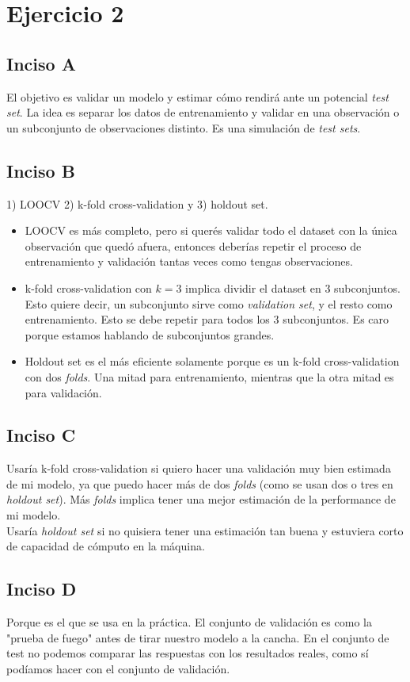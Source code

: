 \documentclass{article}
\begin{document}
    \section*{Ejercicio 2}
        \subsection*{Inciso A}
            El objetivo es validar un modelo y estimar cómo rendirá ante un potencial \textit{test set}. La idea es separar los datos de entrenamiento y validar en una observación o un subconjunto de observaciones distinto. Es una simulación de \textit{test sets}.
        \subsection*{Inciso B}
            1) LOOCV 2) k-fold cross-validation y 3) holdout set.
            \begin{itemize}
                \item LOOCV es más completo, pero si querés validar todo el dataset con la única observación que quedó afuera, entonces deberías repetir el proceso de entrenamiento y validación tantas veces como tengas observaciones.
                \item k-fold cross-validation con $k = 3$ implica dividir el dataset en 3 subconjuntos. Esto quiere decir, un subconjunto sirve como \textit{validation set}, y el resto como entrenamiento. Esto se debe repetir para todos los 3 subconjuntos. Es caro porque estamos hablando de subconjuntos grandes.
                \item Holdout set es el más eficiente solamente porque es un k-fold cross-validation con dos \textit{folds}. Una mitad para entrenamiento, mientras que la otra mitad es para validación.
            \end{itemize}
        \subsection*{Inciso C}
            Usaría k-fold cross-validation si quiero hacer una validación muy bien estimada de mi modelo, ya que puedo hacer más de dos \textit{folds} (como se usan dos o tres en \textit{holdout set}). Más \textit{folds} implica tener una mejor estimación de la performance de mi modelo. \\
            Usaría \textit{holdout set} si no quisiera tener una estimación tan buena y estuviera corto de capacidad de cómputo en la máquina.
        \subsection*{Inciso D}
            Porque es el que se usa en la práctica. El conjunto de validación es como la "prueba de fuego" antes de tirar nuestro modelo a la cancha. En el conjunto de test no podemos comparar las respuestas con los resultados reales, como sí podíamos hacer con el conjunto de validación.
\end{document}
